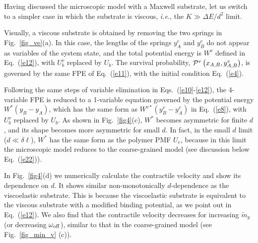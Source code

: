 \documentclass[twocolumn,prl,english]{revtex4-1}
\begin{document}
Having discussed the microscopic model with a Maxwell substrate, let us switch to a simpler case in which the substrate is viscous, {\it i.e.}, the $K\gg\Delta E/d^2$ limit. 

Visually, a viscous substrate is obtained by removing the two springs in Fig.~\ref{fig_ve}(a). 
 In this case, the lengths of the springs $y_A^e$ and $y_B^e$ do not appear as variables of the system state, and the total potential energy is $W^v$ defined in Eq.~(\ref{e12}), with $U_b^v$ replaced by $U_b$. The survival probability, ${\cal P}^v\left(x_{A,B},y_{A,B}^v\right)$, is governed by the same FPE of Eq.~(\ref{e11}), with the initial condition Eq.~(\ref{e4}). 

Following the same steps of variable elimination in Eqs.~(\ref{e10}-\ref{e12}), the 4-variable FPE is reduced to a 1-variable equation governed by the potential energy $W^{*}(y_B-y_A)$, which has the same form as $W^{v*}(y_B^v-y_A^v)$ in Eq.~(\ref{e8}), with $U_b^v$ replaced by $U_b$.  As shown in Fig.~\ref{fig4}(c), $W^{*}$ becomes asymmetric for finite $d$, and its shape becomes more asymmetric for small $d$. In fact, in the small $d$ limit ($d\ll \delta \ell$), $W^{*}$ has the same form as the polymer PMF $U_e$, because in this limit the microscopic model reduces to the coarse-grained model (see discussion below Eq.~(\ref{e22})).


In Fig.~\ref{fig4}(d) we numerically calculate the contractile velocity and show its dependence  on $d$. It shows similar non-monotonically $d$-dependence as the viscoelastic substrate. This is because the viscoelastic substrate is equivalent to the viscous substrate with a modified binding potential, as we point out in Eq.~(\ref{e12}). We also find that the contractile velocity decreases for increasing $\tilde m_y$ (or decreasing $\omega_{\rm off}$), similar to that in the coarse-grained model (see Fig.~\ref{fig_min_v} (c)). 
\end{document}
